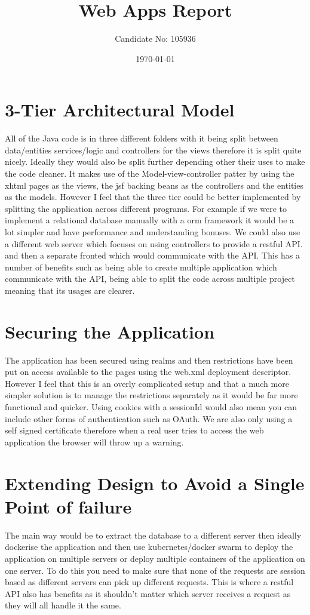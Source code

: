 \documentclass[a4paper,12pt]{scrartcl}
\title{Web Apps Report}
\author{Candidate No: 105936}
\date{\today}
\begin{document}
	
	\begin{titlepage}
		\maketitle
	\end{titlepage}
	
	\tableofcontents
	\newpage
	\section{3-Tier Architectural Model}
	{
		All of the Java code is in three different folders with it being split between data/entities services/logic and controllers for the views therefore it is split quite nicely. Ideally they would also be split further depending other their uses to make the code cleaner. It makes use of the Model-view-controller patter by using the xhtml pages as the views, the jsf backing beans as the controllers and the entities as the models. However I feel that the three tier could be better implemented by splitting the application across different programs. For example if we were to implement a relational database manually with a orm framework it would be a lot simpler and have performance and understanding bonuses. We could also use a different web server which focuses on using controllers to provide a restful API. and then a separate fronted which would communicate with the API. This has a number of benefits such as being able to create multiple application which communicate with the API, being able to split the code across multiple project meaning that its usages are clearer.
	}
	\section{Securing the Application}
	{
		The application has been secured using realms and then restrictions have been put on access available to the pages using the web.xml deployment descriptor. However I feel that this is an overly complicated setup and that a much more simpler solution is to manage the restrictions separately as it would be far more functional and quicker. Using cookies with a sessionId would also mean you can include other forms of authentication such as OAuth. We are also only using a self signed certificate therefore when a real user tries to access the web application the browser will throw up a warning.
	}
	\section{Extending Design to Avoid a Single Point of failure}
	{
		The main way would be to extract the database to a different server then ideally dockerise the application and then use kubernetes/docker swarm to deploy the application on multiple servers or deploy multiple containers of the application on one server. To do this you need to make sure that none of the requests are session based as different servers can pick up different requests. This is where a restful API also has benefits as it shouldn't matter which server receives a request as they will all handle it the same. 
	}
\end{document}
